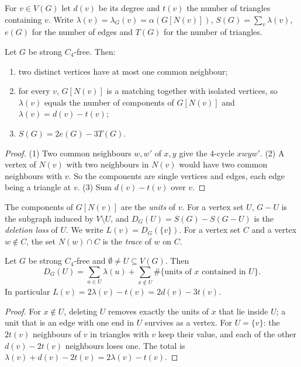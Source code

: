 \documentclass[ASNA]{USG}
\theoremstyle{WBstyletwo}
\numberwithin{equation}{section}
\begin{document}
For $v\in V(G)$ let $d(v)$ be its degree and $t(v)$ the number of triangles containing $v$. Write $\lambda(v)=\lambda_G(v)=\alpha(G[N(v)])$, $S(G)=\sum_v\lambda(v)$, $e(G)$ for the number of edges and $T(G)$ for the number of triangles.

\begin{lemma}\label{lem:basic}
Let $G$ be strong $C_4$-free. Then:
\begin{enumerate}
\item two distinct vertices have at most one common neighbour;
\item for every $v$, $G[N(v)]$ is a matching together with isolated vertices, so $\lambda(v)$ equals the number of components of $G[N(v)]$ and $\lambda(v)=d(v)-t(v)$;
\item $S(G)=2e(G)-3T(G)$.
\end{enumerate}
\end{lemma}

\begin{proof}
(1) Two common neighbours $w,w'$ of $x,y$ give the $4$-cycle $xwyw'$. (2) A vertex of $N(v)$ with two neighbours in $N(v)$ would have two common neighbours with $v$. So the components are single vertices and edges, each edge being a triangle at $v$. (3) Sum $d(v)-t(v)$ over $v$.
\end{proof}

The components of $G[N(v)]$ are the \emph{units} of $v$. For a vertex set $U$, $G-U$ is the subgraph induced by $V\setminus U$, and $D_G(U)=S(G)-S(G-U)$ is the \emph{deletion loss} of $U$. We write $L(v)=D_G(\{v\})$. For a vertex set $C$ and a vertex $w\notin C$, the set $N(w)\cap C$ is the \emph{trace} of $w$ on $C$.

\begin{lemma}\label{lem:loss}
Let $G$ be strong $C_4$-free and $\emptyset\ne U\subseteq V(G)$. Then
\[
D_G(U)=\sum_{u\in U}\lambda(u)+\sum_{x\notin U}\#\{\text{units of }x\text{ contained in }U\}.
\]
In particular $L(v)=2\lambda(v)-t(v)=2d(v)-3t(v)$.
\end{lemma}

\begin{proof}
For $x\notin U$, deleting $U$ removes exactly the units of $x$ that lie inside $U$; a unit that is an edge with one end in $U$ survives as a vertex. For $U=\{v\}$: the $2t(v)$ neighbours of $v$ in triangles with $v$ keep their value, and each of the other $d(v)-2t(v)$ neighbours loses one. The total is $\lambda(v)+d(v)-2t(v)=2\lambda(v)-t(v)$.
\end{proof}
\end{document}
